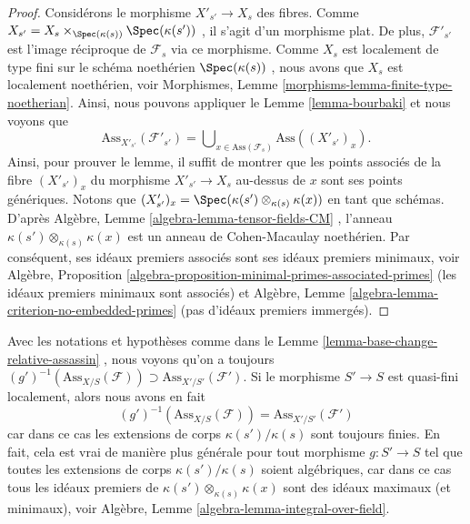 \begin{proof}
Considérons le morphisme  $X'_{s'} \to X_s$  des fibres. Comme  $X_{s'} = X_s \times_{\Spec(\kappa(s))} \Spec(\kappa(s'))$ , il s'agit
d'un morphisme plat. De plus,  $\mathcal{F}'_{s'}$  est l'image réciproque de  $\mathcal{F}_s$ 
via ce morphisme. Comme  $X_s$  est localement de type fini sur le schéma
noethérien  $\Spec(\kappa(s))$ , nous avons que  $X_s$  est localement noethérien,
voir Morphismes, Lemme  \ref{morphisms-lemma-finite-type-noetherian}. Ainsi, nous pouvons appliquer le Lemme
 \ref{lemma-bourbaki}  et nous voyons que
$$
\text{Ass}_{X'_{s'}}(\mathcal{F}'_{s'}) =
\bigcup\nolimits_{x \in \text{Ass}(\mathcal{F}_s)} \text{Ass}((X'_{s'})_x).
$$
Ainsi, pour prouver le lemme, il suffit de montrer que les points associés de la
fibre  $(X'_{s'})_x$  du morphisme  $X'_{s'} \to X_s$  au-dessus de  $x$  sont ses
points génériques. Notons que  $(X'_{s'})_x = \Spec(\kappa(s') \otimes_{\kappa(s)} \kappa(x))$  en tant que schémas. D'après Algèbre,
Lemme  \ref{algebra-lemma-tensor-fields-CM} , l'anneau  $\kappa(s') \otimes_{\kappa(s)} \kappa(x)$  est un anneau de Cohen-Macaulay
noethérien. Par conséquent, ses idéaux premiers associés sont ses idéaux premiers
minimaux, voir Algèbre, Proposition  \ref{algebra-proposition-minimal-primes-associated-primes}  (les idéaux premiers minimaux
sont associés) et Algèbre, Lemme  \ref{algebra-lemma-criterion-no-embedded-primes}  (pas d'idéaux premiers immergés).
\end{proof}

\begin{remark}
\label{remark-base-change-relative-assassin}
Avec les notations et hypothèses comme dans le Lemme  \ref{lemma-base-change-relative-assassin} , nous voyons
qu'on a toujours  $(g')^{-1}(\text{Ass}_{X/S}(\mathcal{F})) \supset
\text{Ass}_{X'/S'}(\mathcal{F}')$. Si le morphisme  $S' \to S$  est
quasi-fini localement, alors nous avons en fait
$$
(g')^{-1}(\text{Ass}_{X/S}(\mathcal{F}))
=
\text{Ass}_{X'/S'}(\mathcal{F}')
$$
car dans ce cas les extensions de corps  $\kappa(s')/\kappa(s)$  sont toujours finies. En
fait, cela est vrai de manière plus générale pour tout morphisme  $g : S' \to S$  tel
que toutes les extensions de corps  $\kappa(s')/\kappa(s)$  soient algébriques, car dans ce
cas tous les idéaux premiers de  $\kappa(s') \otimes_{\kappa(s)} \kappa(x)$  sont des idéaux maximaux (et
minimaux), voir Algèbre, Lemme  \ref{algebra-lemma-integral-over-field}.
\end{remark}




